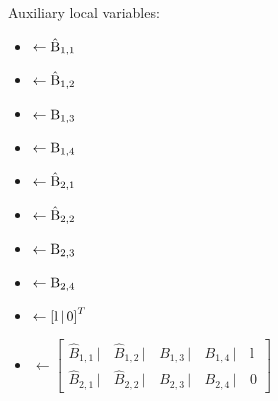 \vskip 5pt
\begin{minipage}[t]{\textwidth}
Auxiliary local variables: \vspace{-10pt}
\begin{itemize}
	\itemsep -8pt
	\item {} $\leftarrow \mathrm{\hat B_{1,1}}$
	\item {} $\leftarrow \mathrm{\hat B_{1,2}}$
	\item {} $\leftarrow \mathrm{B_{1,3}}$
	\item {} $\leftarrow \mathrm{B_{1,4}}$
	\item {} $\leftarrow \mathrm{\hat B_{2,1}}$
	\item {} $\leftarrow \mathrm{\hat B_{2,2}}$
	\item {} $\leftarrow \mathrm{B_{2,3}}$
	\item {} $\leftarrow \mathrm{B_{2,4}}$
	
	\item {} $\leftarrow \mathrm{\left[ {l} \, | \, 0\right]}^T$
	\item \vskip 4pt  $\leftarrow \left[\begin{array}{c|c|c|c|c}
	\hat B_{1,1} \, | \, & \hat B_{1,2} \, | \, & B_{1,3} \, | \, & B_{1,4} \, | \, & \text{l} \\ \hline
	\hat B_{2,1} \, | \, & \hat B_{2,2} \, | \, & B_{2,3} \, | \, & B_{2,4} \, | \, & 0
	\end{array} \right]$
\end{itemize}
\end{minipage}

